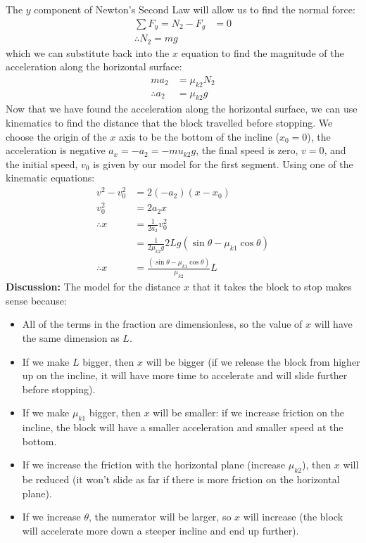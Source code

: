 \begin{example}
The $y$ component of Newton's Second Law will allow us to find the normal force:
\begin{align*}
\sum F_y = N_2 -F_g &=0\\
\therefore N_2 = mg
\end{align*}
which we can substitute back into the $x$ equation to find the magnitude of the acceleration along the horizontal surface:
\begin{align*}
ma_2 &=\mu_{k2}N_2 \\
\therefore a_2&=\mu_{k2}g
\end{align*}
Now that we have found the acceleration along the horizontal surface, we can use kinematics to find the distance that the block travelled before stopping. We choose the origin of the $x$ axis to be the bottom of the incline ($x_0=0$), the acceleration is negative $a_x = -a_2 = -mu_{k2}g$, the final speed is zero, $v=0$, and the initial speed, $v_0$ is given by our model for the first segment. Using one of the kinematic equations:
\begin{align*}
v^2-v_0^2&=2(-a_2)(x-x_0)\\
v_0^2&=2a_2x\\
\therefore x &=\frac{1}{2a_2}v_0^2\\
&=\frac{1}{2\mu_{k2}g}2Lg(\sin\theta-\mu_{k1}\cos\theta)\\
\therefore x&=\frac{(\sin\theta-\mu_{k1}\cos\theta)}{\mu_{k2}}L
\end{align*}
\textbf{Discussion:} The model for the distance $x$ that it takes the block to stop makes sense because:
\begin{itemize}
\item All of the terms in the fraction are dimensionless, so the value of $x$ will have the same dimension as $L$. 
\item If we make $L$ bigger, then $x$ will be bigger (if we release the block from higher up on the incline, it will have more time to accelerate and will slide further before stopping).
\item If we make $\mu_{k1}$ bigger, then $x$ will be smaller: if we increase friction on the incline, the block will have a smaller acceleration and smaller speed at the bottom.
\item If we increase the friction with the horizontal plane (increase $\mu_{k2}$), then $x$ will be reduced (it won't slide as far if there is more friction on the horizontal plane).
\item If we increase $\theta$, the numerator will be larger, so $x$ will increase (the block will accelerate more down a steeper incline and end up further).
\end{itemize} 

\end{example}

